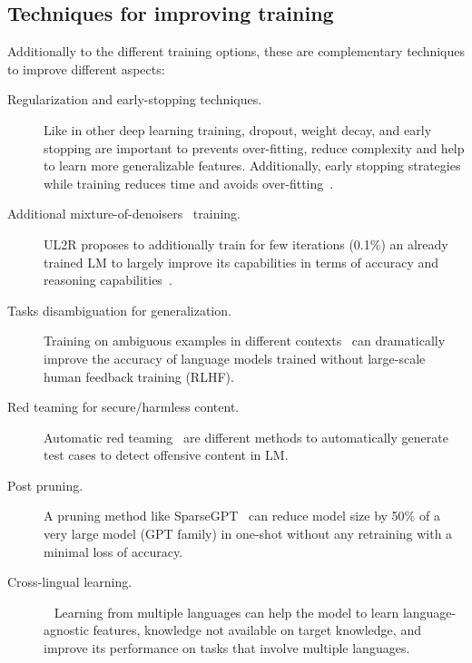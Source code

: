 \documentclass[acmsmall]{acmart}
\begin{document}
\subsection{Techniques for improving training}\label{sec_improvetraining}
Additionally to the different training options, these are complementary techniques to improve different aspects:
\begin{description}    
    \item [Regularization and early-stopping techniques.]
Like in other deep learning training, dropout, weight decay, and early stopping are important to prevents over-fitting, reduce complexity and help to learn more generalizable features. Additionally, early stopping strategies while training reduces time and avoids over-fitting~\citep{schusterConfidentAdaptiveLanguage2022}.

    \item [Additional mixture-of-denoisers~\citep{tayUL2UnifyingLanguage2022} training.]
UL2R proposes to additionally train for few iterations (0.1\%) an already trained LM to largely improve its capabilities in terms of accuracy and reasoning capabilities~\citep{tayTranscendingScalingLaws2022}.

    \item [Tasks disambiguation for generalization.]
Training on ambiguous examples in different contexts~\citep{anonymousTaskAmbiguityHumans2022} can dramatically improve the accuracy of language models trained without large-scale human feedback training (RLHF).

    \item [Red teaming for secure/harmless content.] 
Automatic red teaming~\citep{ganguliRedTeamingLanguage2022, perezRedTeamingLanguage2022} are different methods to automatically generate test cases to detect offensive content in LM.

    \item [Post pruning.]
A pruning method like SparseGPT~\citep{frantarSparseGPTMassiveLanguage2023} can reduce model size by 50\% of a very large model (GPT family) in one-shot without any retraining with a minimal loss of accuracy.

    \item [Cross-lingual learning.]~\citep{lampleCrosslingualLanguageModel2019, chiInfoXLMInformationTheoreticFramework2021}
Learning from multiple languages can help the model to learn language-agnostic features, knowledge not available on target knowledge, and improve its performance on tasks that involve multiple languages.
\end{description}
\end{document}
